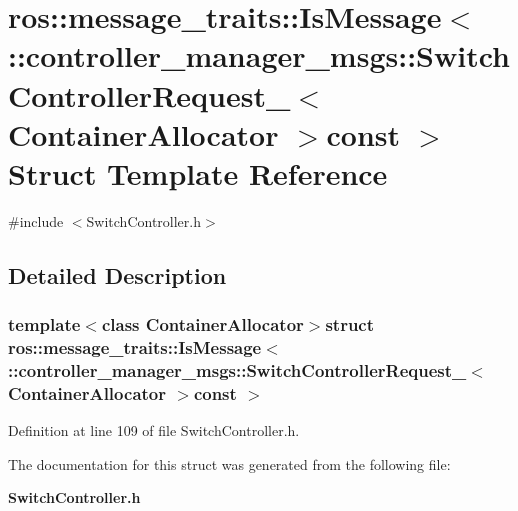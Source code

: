 \section{ros\-:\-:message\-\_\-traits\-:\-:\-Is\-Message$<$ \-:\-:controller\-\_\-manager\-\_\-msgs\-:\-:\-Switch\-Controller\-Request\-\_\-$<$ \-Container\-Allocator $>$const $>$ \-Struct \-Template \-Reference}
\label{structros_1_1message__traits_1_1IsMessage_3_01_1_1controller__manager__msgs_1_1SwitchControllerRdc707e0302595ff637fb99d9906d16a3}


{\ttfamily \#include $<$\-Switch\-Controller.\-h$>$}



\subsection{\-Detailed \-Description}
\subsubsection*{template$<$class Container\-Allocator$>$struct ros\-::message\-\_\-traits\-::\-Is\-Message$<$ \-::controller\-\_\-manager\-\_\-msgs\-::\-Switch\-Controller\-Request\-\_\-$<$ Container\-Allocator $>$const  $>$}



\-Definition at line 109 of file \-Switch\-Controller.\-h.



\-The documentation for this struct was generated from the following file\-:\begin{DoxyCompactItemize}
\item 
{\bf \-Switch\-Controller.\-h}\end{DoxyCompactItemize}
